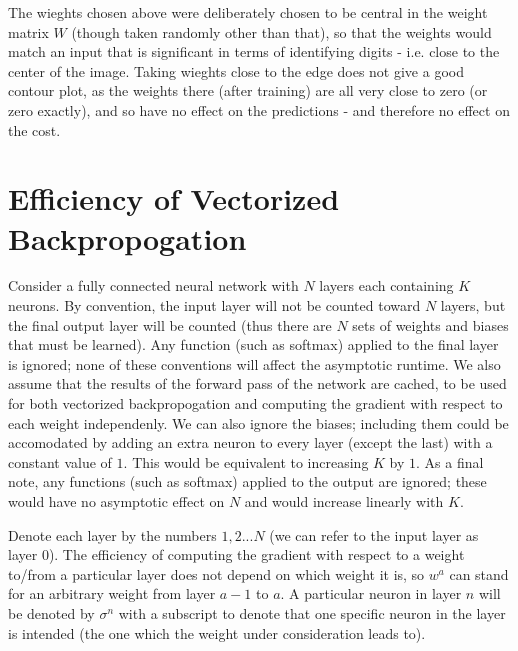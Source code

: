 \documentclass{article}
\begin{document}
   The wieghts chosen above were deliberately chosen to be central in the weight matrix $W$ (though
   taken randomly other than that), so that the weights would match an input that is significant
   in terms of identifying digits - i.e. close to the center of the image.
   Taking wieghts close to the edge does not give a good contour plot, as the weights there (after training) are all
   very close to zero (or zero exactly), and so have no effect on the predictions - and therefore
   no effect on the cost.


   \section{Efficiency of Vectorized Backpropogation}
   Consider a fully connected neural network with $N$ layers each containing $K$ neurons. By convention,
   the input layer will not be counted toward $N$ layers, but the final output layer will be
   counted (thus there are $N$ sets of weights and biases that must be learned). Any function
   (such as softmax) applied to the final layer is ignored; none of these conventions will
   affect the asymptotic runtime. We also assume that the results of the forward pass of the
   network are cached, to be used for both vectorized backpropogation and computing the
   gradient with respect to each weight independenly.
   We can also ignore the biases; including them could be accomodated by adding an extra
   neuron to every layer (except the last) with a constant value of $1$. This would be
   equivalent to increasing $K$ by $1$. As a final note, any functions (such as softmax) applied
   to the output are ignored; these would have no asymptotic effect on $N$ and would increase
   linearly with $K$.

   Denote each layer by the numbers $1,2... N$ (we can refer to the input layer as layer $0$).
   The efficiency of computing the gradient with respect to a weight to/from a particular layer
   does not depend on which weight it is, so $w^{a}$ can stand for an arbitrary weight from
   layer $a-1$ to $a$. A particular neuron in layer $n$ will be denoted by $\sigma^n$ with a
   subscript to denote that one specific neuron in the layer is intended (the one which the
   weight under consideration leads to).
\end{document}
